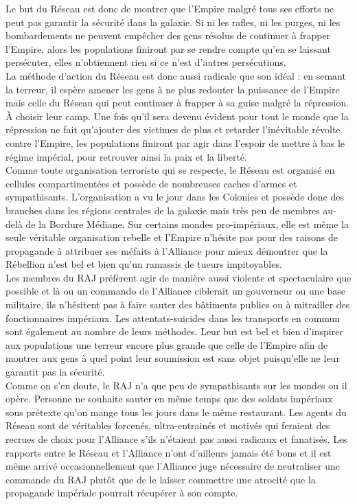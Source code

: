 \documentclass[twoside]{article}
\begin{document}
Le but du Réseau est donc de montrer que l'Empire malgré tous ses efforts ne peut pas garantir la sécurité dans la galaxie. Si ni les rafles, ni les purges, ni les bombardements ne peuvent empêcher des gens résolus de continuer à frapper l'Empire, alors les populations finiront par se rendre compte qu'en se laissant persécuter, elles n'obtiennent rien si ce n'est d'autres persécutions.\\

La méthode d'action du Réseau est donc aussi radicale que son idéal : en semant la terreur, il espère amener les gens à ne plus redouter la puissance de l'Empire mais celle du Réseau qui peut continuer à frapper à sa guise malgré la répression. À choisir leur camp. Une fois qu'il sera devenu évident pour tout le monde que la répression ne fait qu'ajouter des victimes de plus et retarder l'inévitable révolte contre l'Empire, les populations finiront par agir dans l'espoir de mettre à bas le régime impérial, pour retrouver ainsi la paix et la liberté.\\

Comme toute organisation terroriste qui se respecte, le Réseau est organisé en cellules compartimentées et possède de nombreuses caches d'armes et sympathisants. L'organisation a vu le jour dans les Colonies et possède donc des branches dans les régions centrales de la galaxie mais très peu de membres au-delà de la Bordure Médiane. Sur certains mondes pro-impériaux, elle est même la seule véritable organisation rebelle et l'Empire n'hésite pas pour des raisons de propagande à attribuer ses méfaits à l'Alliance pour mieux démontrer que la Rébellion n'est bel et bien qu'un ramassis de tueurs impitoyables.\\

Les membres du RAJ préfèrent agir de manière aussi violente et spectaculaire que possible et là ou un commando de l'Alliance ciblerait un gouverneur ou une base militaire, ils n'hésitent pas à faire sauter des bâtiments publics ou à mitrailler des fonctionnaires impériaux. Les attentats-suicides dans les transports en commun sont également au nombre de leurs méthodes. Leur but est bel et bien d'inspirer aux populations une terreur encore plus grande que celle de l'Empire afin de montrer aux gens à quel point leur soumission est sans objet puisqu'elle ne leur garantit pas la sécurité.\\

Comme on s'en doute, le RAJ n'a que peu de sympathisants sur les mondes ou il opère. Personne ne souhaite sauter en même temps que des soldats impériaux sous prétexte qu'on mange tous les jours dans le même restaurant. Les agents du Réseau sont de véritables forcenés, ultra-entrainés et motivés qui feraient des recrues de choix pour l'Alliance s'ils n'étaient pas aussi radicaux et fanatisés. Les rapports entre le Réseau et l'Alliance n'ont d'ailleurs jamais été bons et il est même arrivé occasionnellement que l'Alliance juge nécessaire de neutraliser une commande du RAJ plutôt que de le laisser commettre une atrocité que la propagande impériale pourrait récupérer à son compte.
\end{document}
